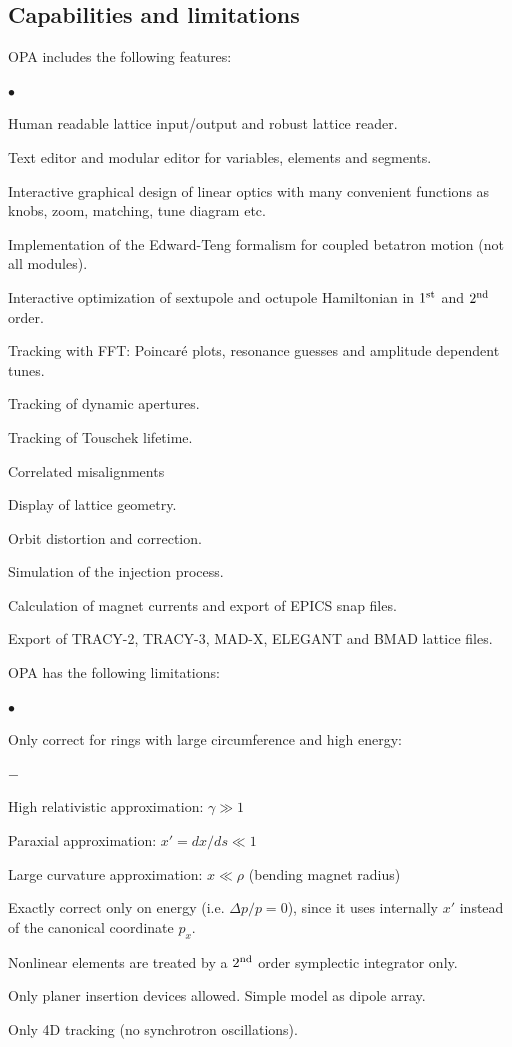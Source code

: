 \documentclass[12pt]{article}
\newenvironment{mylist}
  {\begin{list}{$\bullet$}{\parsep 0pt}}
  {\end{list}}
\newenvironment{mysublist}
  {\begin{list}{$-$}{\parsep 0pt \topsep 0pt \leftmargin 2cm}}
  {\end{list}}
\begin{document}
\subsection{Capabilities and limitations}
OPA includes the following features:
\begin{mylist}
\item Human readable lattice input/output and robust lattice reader.
\item Text editor and modular editor for variables, elements and segments.
\item Interactive graphical design of linear optics with many convenient functions as knobs, zoom, matching, tune diagram etc.
\item Implementation of the Edward-Teng formalism for coupled betatron motion (not all modules).
\item Interactive optimization of sextupole and octupole Hamiltonian in $1^{\rm st}$ and $2^{\rm nd}$ order.
\item Tracking with FFT: Poincar\'e plots, resonance guesses and amplitude dependent tunes.
\item Tracking of dynamic apertures.
\item Tracking of Touschek lifetime.
\item Correlated misalignments
\item Display of lattice geometry.
\item Orbit distortion and correction.
\item Simulation of the injection process.
\item Calculation of magnet currents and export of EPICS snap files.
\item Export of TRACY-2, TRACY-3, MAD-X, ELEGANT and BMAD lattice files.
\end{mylist}

OPA has the following limitations:
\begin{mylist}
\item Only correct for rings with large circumference and high energy:
\begin{mysublist}
\item High relativistic approximation: $\gamma \gg 1$
\item Paraxial approximation: $x' = dx / ds \ll 1$
\item Large curvature approximation: $x \ll \rho$ (bending magnet radius)
\end{mysublist}
\item Exactly correct only on energy (i.e. $\Delta p/p = 0$),
since it uses internally $x'$  instead of the canonical coordinate $p_x$.
\item Nonlinear elements are treated by a $2^{\rm nd}$ order symplectic integrator only.
\item Only planer insertion devices allowed. Simple model as dipole array.
\item Only 4D tracking (no synchrotron oscillations).
\end{mylist}
\end{document}
